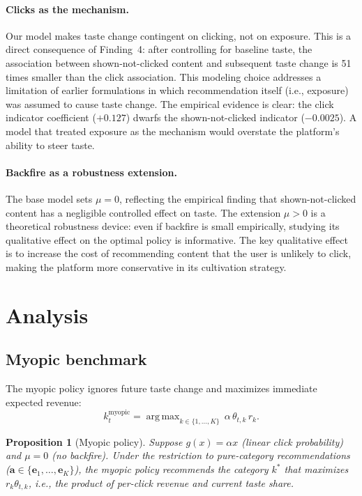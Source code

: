\documentclass[11pt]{article}
\newtheorem{proposition}{Proposition}
\DeclareMathOperator*{\argmax}{arg\,max}
\begin{document}
\paragraph{Clicks as the mechanism.} Our model makes taste change contingent on clicking, not on exposure. This is a direct consequence of Finding~4: after controlling for baseline taste, the association between shown-not-clicked content and subsequent taste change is 51 times smaller than the click association. This modeling choice addresses a limitation of earlier formulations in which recommendation itself (i.e., exposure) was assumed to cause taste change. The empirical evidence is clear: the click indicator coefficient ($+0.127$) dwarfs the shown-not-clicked indicator ($-0.0025$). A model that treated exposure as the mechanism would overstate the platform's ability to steer taste.

\paragraph{Backfire as a robustness extension.} The base model sets $\mu = 0$, reflecting the empirical finding that shown-not-clicked content has a negligible controlled effect on taste. The extension $\mu > 0$ is a theoretical robustness device: even if backfire is small empirically, studying its qualitative effect on the optimal policy is informative. The key qualitative effect is to increase the cost of recommending content that the user is unlikely to click, making the platform more conservative in its cultivation strategy.

\section{Analysis}
\label{sec:analysis}

\subsection{Myopic benchmark}

The myopic policy ignores future taste change and maximizes immediate expected revenue:
\begin{equation}\label{eq:myopic}
k_t^{\text{myopic}} = \argmax_{k \in \{1,\ldots,K\}} \, \alpha \, \theta_{t,k} \, r_k.
\end{equation}

\begin{proposition}[Myopic policy]\label{prop:myopic}
Suppose $g(x) = \alpha x$ (linear click probability) and $\mu = 0$ (no backfire). Under the restriction to pure-category recommendations ($\mathbf{a} \in \{\mathbf{e}_1, \ldots, \mathbf{e}_K\}$), the myopic policy recommends the category $k^*$ that maximizes $r_k \theta_{t,k}$, i.e., the product of per-click revenue and current taste share.
\end{proposition}
\end{document}
